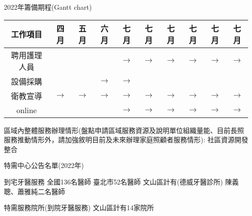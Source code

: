 2022年籌備期程(Gantt chart)\\
\begin{tabular}{|c|ccccccccc|}
\hline
 工作項目 & 四月 & 五月  & 六月 & 七月  & 七月  & 七月  & 七月  & 七月  & 七月  \\
\hline
 聘用護理人員    &  & &  & $\longrightarrow$ & $\longrightarrow$ & $\longrightarrow$ & $\longrightarrow$ & $\longrightarrow$ & $\longrightarrow$  \\
 設備採購    &  &  & $\longrightarrow$ & $\longrightarrow$ & &&&&  \\
 衛教宣導    & $\longrightarrow$ & $\longrightarrow$ & $\longrightarrow$ & $\longrightarrow$  & $\longrightarrow$ & $\longrightarrow$ & $\longrightarrow$ & $\longrightarrow$ & $\longrightarrow$ \\
 online    &  & &  & $\longrightarrow$ & $\longrightarrow$ & $\longrightarrow$ & $\longrightarrow$ & $\longrightarrow$ & $\longrightarrow$  \\
\hline
\end{tabular}

\vspace{5mm}
區域內整體服務辦理情形(盤點申請區域服務資源及說明單位組織量能、目前長照服務推動情形外，請加強敘明目前及未來辦理家庭照顧者服務情形):
社區資源開發整合

特需中心公告名單(2022年)
\begin{outline}

\1 到宅牙醫服務
\2 全國136名醫師
\2 臺北市52名醫師
\2 文山區計有(德威牙醫診所) 陳義聰、蕭雅純二名醫師

\1 特需服務院所(到院牙醫服務)
\2 文山區計有14家院所
\end{outline}

